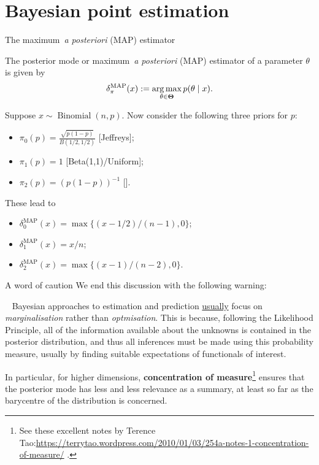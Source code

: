 \section{Bayesian point estimation}
\begin{frame}{The maximum~\textit{a posteriori} (MAP) estimator}
\begin{defn}
The posterior mode or maximum~\textit{a posteriori} (MAP) estimator of a parameter $\theta$ is given by
\begin{equation}
 \label{eq:MAP}
 \delta_{\pi}^{\text{MAP}}(x) := \operatorname*{arg\,max}_{\theta \in \boldsymbol{\Theta}} p(\theta \mid x).
\end{equation}
\end{defn}
\begin{example}
 Suppose $x \sim \operatorname{Binomial}(n, p)$.
 Now consider the following three priors for $p$: 
 \begin{itemize}
  \item $\pi_0(p) = \frac{\sqrt{p(1-p)}}{B(1/2, 1/2)} $ [Jeffreys];
  \item $\pi_1(p) = 1$ [Beta(1,1)/Uniform];
  \item $\pi_2(p) = \left(p(1-p)\right)^{-1}$ [\cite{Haldane1932}].  
 \end{itemize}
These lead to 
\begin{itemize}
 \item $\delta_0^{\text{MAP}}(x) = \max \{(x-1/2)/(n-1), 0 \}$;
 \item $\delta_1^{\text{MAP}}(x) = x/n$;
 \item $\delta_2^{\text{MAP}}(x) = \max \{ (x-1)/(n-2), 0 \}$.
\end{itemize}
\end{example}
\end{frame}
\begin{frame}{A word of caution}
 We end this discussion with the following warning:
\begin{idea}
\label{idea:always_marginalise}~
 Bayesian approaches to estimation and prediction \underline{usually} focus on \textit{marginalisation} rather than \textit{optmisation}.
 This is because, following the Likelihood Principle, all of the information available about the unknowns is contained in the posterior distribution, and thus all inferences must be made using this probability measure, usually by finding suitable expectations of functionals of interest.
\end{idea}
In particular, for higher dimensions, \textbf{concentration of measure}\footnote{See these excellent notes by Terence Tao:\url{https://terrytao.wordpress.com/2010/01/03/254a-notes-1-concentration-of-measure/} .} ensures that the posterior mode has less and less relevance as a summary, at least so far as the barycentre of the distribution is concerned.
\end{frame}
